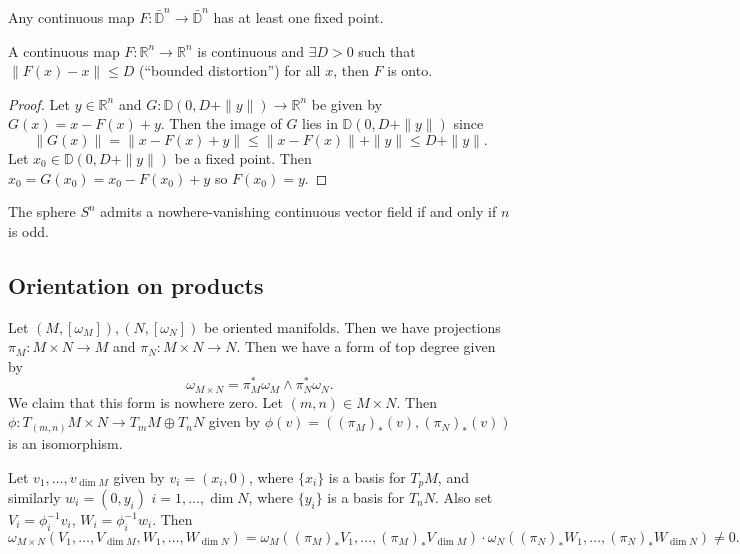 \begin{theorem}
Any continuous map $F: \bar{\mathbb{D}}^n \to \bar{\mathbb{D}}^n$ has at least one fixed point.
\end{theorem}

\begin{theorem}
A continuous map $F: \mathbb{R}^n \to \mathbb{R}^n$ is continuous and
$\exists D > 0$ such that $\|F(x) - x\| \leq D$ (``bounded
distortion'')
for all $x$, then $F$ is onto.
\end{theorem}

\begin{proof}
Let $y \in \mathbb{R}^n$ and $G: \mathbb{D}(0, D + \| y \|) \to \mathbb{R}^n$
be given by $G(x) = x - F(x) + y$. Then the image of $G$ lies in
$\mathbb{D}(0, D + \| y \|)$ since
$$
     \| G(x) \|
=    \| x - F(x) + y \|
\leq \| x - F(x) \| + \| y \|
\leq D + \| y \|.
$$
Let $x_0 \in \mathbb{D}(0, D + \| y \|)$ be a fixed point. Then
$x_0 = G(x_0) = x_0 - F(x_0) + y$ so $F(x_0) = y$.
\end{proof}

\begin{theorem}
The sphere $S^n$ admits a nowhere-vanishing continuous vector field if
and only if $n$ is odd.
\end{theorem}

\subsection{Orientation on products}
Let $(M, [\omega_M]), (N, [\omega_N])$ be oriented manifolds. Then we
have projections
$\pi_M : M \times N \to M$ and $\pi_N : M \times N \to N$. Then
we have a form of top degree given by
$$
\omega_{M \times N} = \pi_M^\ast \omega_M \wedge \pi_N^\ast \omega_N.
$$
We claim that this form is nowhere zero. Let $(m, n) \in M \times N$.
Then $\phi : T_{(m, n)} M \times N \to T_m M \oplus T_n N$ given by
$\phi(v) = ((\pi_M)_\ast(v), (\pi_N)_\ast(v))$ is an isomorphism.

Let $v_1, \dots, v_{\dim M}$ given by $v_i = (x_i, 0)$, where $\{x_i\}$ is a
basis for $T_p M$, and similarly $w_i = (0, y_i)$
$i = 1, \dots, \dim N$, where $\{y_i\}$ is a
basis for $T_n N$. Also set $V_i = \phi_{i}^{-1} v_i$,
$W_i = \phi_i^{-1} w_i$. Then
$$
  \omega_{M \times N}(V_1, \dots, V_{\dim M}, W_1, \dots, W_{\dim N})
= \omega_M((\pi_M)_\ast V_1, \dots, (\pi_M)_\ast V_{\dim M}) \cdot
  \omega_N((\pi_N)_\ast W_1, \dots, (\pi_N)_\ast W_{\dim N})
\neq 0.
$$

